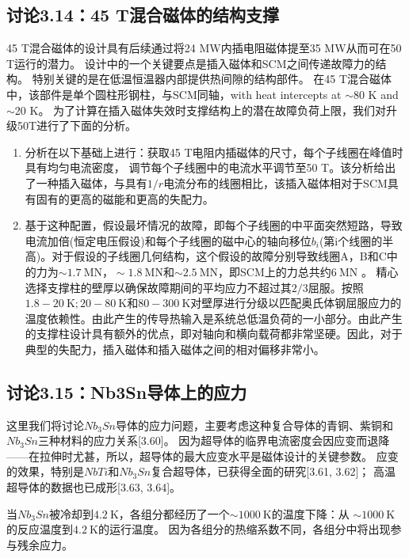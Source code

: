 \subsection{讨论3.14：45 T混合磁体的结构支撑}
45 T混合磁体的设计具有后续通过将24 MW内插电阻磁体提至35 MW从而可在50 T运行的潜力。
设计中的一个关键要点是插入磁体和SCM之间传递故障力的结构。
特别关键的是在低温恒温器内部提供热间隙的结构部件。
在45 T混合磁体中，该部件是单个圆柱形钢柱，与SCM同轴，with heat intercepts at $\sim$80 K and $\sim$20 K。
为了计算在插入磁体失效时支撑结构上的潜在故障负荷上限，我们对升级50T进行了下面的分析。
\begin{enumerate}
	\item 分析在以下基础上进行：获取45 T电阻内插磁体的尺寸，每个子线圈在峰值时具有均匀电流密度，
	调节每个子线圈中的电流水平调节至50 T。该分析给出了一种插入磁体，与具有$1 / r$电流分布的线圈相比，该插入磁体相对于SCM具有固有的更高的磁能和更高的失配力。
	
	\item 基于这种配置，假设最坏情况的故障，即每个子线圈的中平面突然短路，导致电流加倍(恒定电压假设)和每个子线圈的磁中心的轴向移位$b_i$(第i个线圈的半高)。对于假设的子线圈几何结构，这个假设的故障分别导致线圈A，B和C中的力为$\sim 1.7\ \mathrm{MN} ，\sim 1.8\ \mathrm{MN}$和$\sim 2.5\ \mathrm{MN}$，即SCM上的力总共约$6\ \mathrm{MN}$ 。
	精心选择支撑柱的壁厚以确保故障期间的平均应力不超过其$2/3$屈服。按照$1.8-20\ \mathrm{K};20-80\ \mathrm{K}$和$80-300 \ \mathrm{K}$对壁厚进行分级以匹配奥氏体钢屈服应力的温度依赖性。由此产生的传导热输入是系统总低温负荷的一小部分。由此产生的支撑柱设计具有额外的优点，即对轴向和横向载荷都非常坚硬。因此，对于典型的失配力，插入磁体和插入磁体之间的相对偏移非常小。
\end{enumerate}



\subsection{讨论3.15：Nb3Sn导体上的应力}
这里我们将讨论$Nb_3Sn$导体的应力问题，主要考虑这种复合导体的青铜、紫铜和$Nb_3Sn$三种材料的应力关系[3.60]。
因为超导体的临界电流密度会因应变而退降——在拉伸时尤甚，所以，超导体的最大应变水平是磁体设计的关键参数。
应变的效果，特别是$NbTi$和$Nb_3Sn$复合超导体，已获得全面的研究[3.61, 3.62]；
高温超导体的数据也已成形[3.63, 3.64]。

当$Nb_3Sn$被冷却到$4.2\ \mathrm{K}$，各组分都经历了一个$\sim 1000\ \mathrm{K}$的温度下降：从
$\sim 1000\ \mathrm{K}$的反应温度到$4.2\ \mathrm{K}$的运行温度。
因为各组分的热缩系数不同，各组分中将出现参与残余应力。

